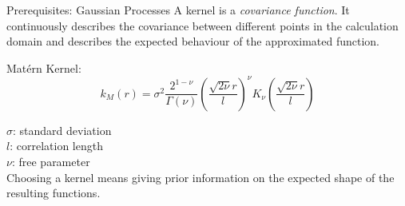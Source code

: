 \documentclass[fleqn,11pt,aspectratio=43]{beamer}
\begin{document}


%







\begin{frame}{Prerequisites: Gaussian Processes}
A kernel is a \emph{covariance function}.  It continuously describes the covariance between different points in the calculation domain and describes the expected behaviour of the approximated function.
\begin{block}{Mat\'ern Kernel:}
\begin{equation*}
k_M(r) = \sigma^2 \frac{2^{1-\nu}}{\Gamma(\nu)}  \left( \frac{\sqrt{2\nu}r}{l}  \right)^{\nu} K_{\nu}  \left(  \frac{\sqrt{2\nu}r}{l}   \right)
\label{eqn:MaternKernel}
\end{equation*}
\end{block}
$\sigma$: standard deviation\\
$l$: correlation length\\
$\nu$: free parameter\\

Choosing a kernel means giving prior information on the expected shape of the resulting functions.%
\end{frame}
\end{document}
